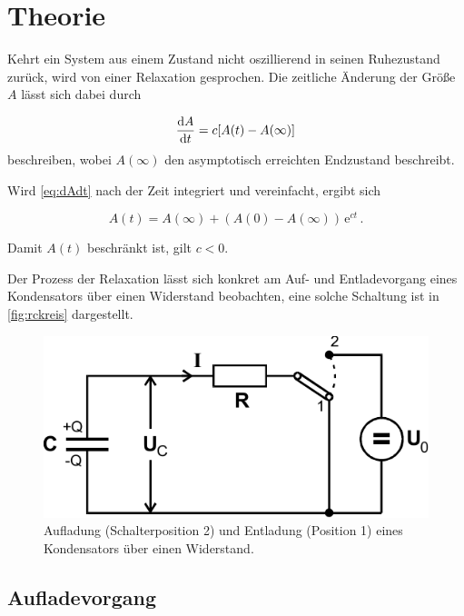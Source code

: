 \section{Theorie}
\label{sec:Theorie}

Kehrt ein System aus einem Zustand nicht oszillierend in seinen Ruhezustand zurück, wird von einer Relaxation gesprochen.
Die zeitliche Änderung der Größe $A$ lässt sich dabei durch

\begin{equation}
    \frac{\mathrm{d} A}{\mathrm{d} t} = c[A(t) - A(\infty)]
    \label{eq:dAdt}
\end{equation} beschreiben, wobei $A(\infty)$ den asymptotisch erreichten Endzustand beschreibt.

Wird \eqref{eq:dAdt} nach der Zeit integriert und vereinfacht, ergibt sich

\begin{equation}
    A(t) = A(\infty) + (A(0) - A(\infty)) \,\mathrm{e}^{ct} \,.
    \label{eq:At}
\end{equation}

Damit $A(t)$ beschränkt ist, gilt $c < 0$.

Der Prozess der Relaxation lässt sich konkret am Auf- und Entladevorgang eines Kondensators über einen Widerstand beobachten, eine solche Schaltung ist in \autoref{fig:rckreis} dargestellt.

\begin{figure}[H]
    \centering
    \includegraphics{figures/RC-Kreis.pdf}
    \caption{Aufladung (Schalterposition 2) und Entladung (Position 1) eines Kondensators über einen Widerstand\cite{ap08}.}
    \label{fig:rckreis}
\end{figure}

\subsection{Aufladevorgang}

